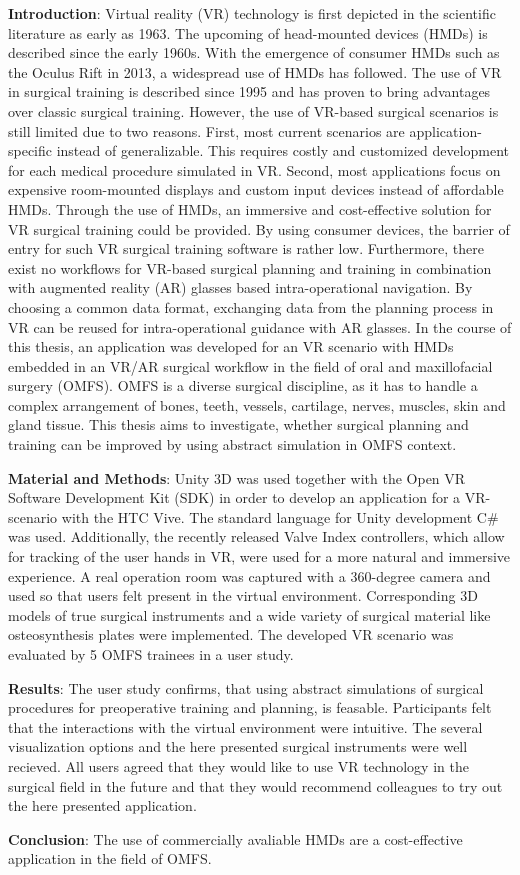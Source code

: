 \textbf{Introduction}: Virtual reality (VR) technology is first depicted in the scientific literature as early as 1963.
The upcoming of head-mounted devices (HMDs) is described since the early 1960s.
With the emergence of consumer HMDs such as the Oculus Rift in 2013, a widespread use of HMDs has followed.
The use of VR in surgical training is described since 1995 and has proven to bring advantages over classic surgical training.
However, the use of VR-based surgical scenarios is still limited due to two reasons.
First, most current scenarios are application-specific instead of generalizable.
This requires costly and customized development for each medical procedure simulated in VR.
Second, most applications focus on expensive room-mounted displays and custom input devices instead of affordable HMDs.
Through the use of HMDs, an immersive and cost-effective solution for VR surgical training could be provided.
By using consumer devices, the barrier of entry for such VR surgical training software is rather low.
Furthermore, there exist no workflows for VR-based surgical planning and training in combination with augmented reality (AR) glasses based intra-operational navigation.
By choosing a common data format, exchanging data from the planning process in VR can be reused for intra-operational guidance with AR glasses.
In the course of this thesis, an application was developed for an VR scenario with HMDs embedded in an VR/AR surgical workflow in 
the field of oral and maxillofacial surgery (OMFS).
OMFS is a diverse surgical discipline, as it has to handle 
a complex arrangement of bones, teeth, vessels, cartilage, nerves, muscles,
skin and gland tissue. This thesis aims to investigate,
whether surgical planning and training can be improved by using
abstract simulation in OMFS context.

\textbf{Material and Methods}: Unity 3D was used together with the Open VR Software Development Kit (SDK) in order to develop an application for a VR-scenario with the HTC Vive.
The standard language for Unity development C\# was used. 
Additionally, the recently released Valve Index controllers, which allow for tracking of the user hands in VR, were used for a more natural and immersive experience.
A real operation room was captured with a 360-degree camera and used so that users felt present in the virtual environment.
Corresponding 3D models of true surgical instruments and a wide variety of surgical material like osteosynthesis plates were implemented.
The developed VR scenario was evaluated by 5 OMFS trainees in a user study.

\textbf{Results}: The user study confirms, that using abstract simulations of surgical procedures for preoperative training and planning, is feasable. Participants felt that the 
interactions with the virtual environment were intuitive. The several visualization options and the here presented surgical instruments were well recieved. All users
agreed that they would like to use VR technology in the surgical field in the future and that they would recommend colleagues to try out the here presented
application. 

\textbf{Conclusion}: The use of commercially avaliable HMDs are a cost-effective application in the field of OMFS.

